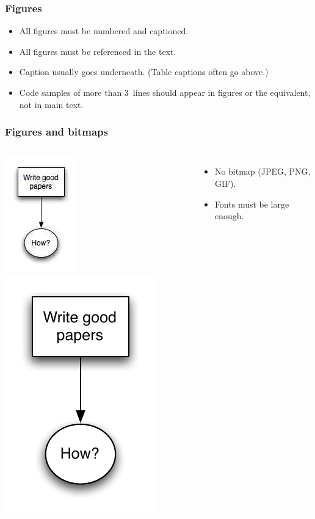 \documentclass[handout]{beamer}
\begin{document}
\frame
{
  \frametitle{Figures}

  \begin{itemize}
  \item<1-> All figures must be numbered and captioned.
  \item<2-> All figures must be referenced in the text.
  \item<3->  Caption usually goes underneath. (Table captions often go above.)
  \item<4-> Code samples of more than 3~lines should appear in figures or the equivalent, not in main text.
  \end{itemize}

  }


\frame
{
  \frametitle{Figures and bitmaps}
  \begin{columns}
 \column{3.5cm}
  \includegraphics{badbitmap.jpg}
 \column{3.5cm}
  \includegraphics{badbitmap.pdf}
 \column{7cm}
  \begin{itemize}
  \item<1->  No bitmap (JPEG, PNG, GIF).
  \item<2->   Fonts must be large enough.
  \end{itemize}
 \end{columns}

 }
\end{document}
